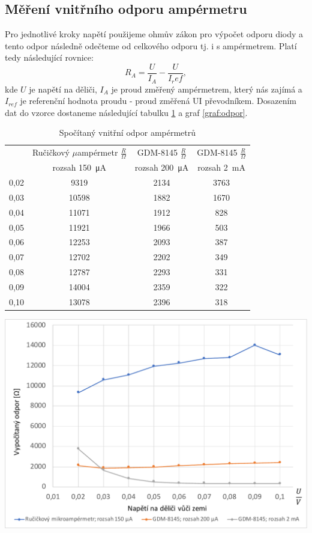 \documentclass[a4paper,12pt]{article}   %
\newcommand{\tmu}{$\mu$}
\begin{document}
\subsection{Měření vnitřního odporu ampérmetru}
Pro jednotlivé kroky napětí použijeme ohmův zákon pro výpočet odporu diody a tento odpor následně odečteme od celkového odporu tj. i s ampérmetrem. Platí tedy následující rovnice:
\begin{equation}
    R_A=\frac{U}{I_A} - \frac{U}{I_ref},
\end{equation}
kde $U$ je napětí na děliči, $I_A$ je proud změřený ampérmetrem, který nás zajímá a $I_{ref}$ je referenční hodnota proudu - proud změřená UI převodníkem. Dosazením dat do vzorce dostaneme následující tabulku \ref{tab:odpor} a graf \ref{graf:odpor}.
\begin{table}[h!]
    \centering
    \begin{tabular}{|c|c|c|c|}
        \hline
        \rule{0pt}{2.5ex}
        \multirow{2}{*}{Napětí na děliči} &Ručičkový \tmu ampérmetr	$\frac{R}{\Omega}$ &GDM-8145 $\frac{R}{\Omega}$	&GDM-8145 $\frac{R}{\Omega}$\\[.7ex]
        & rozsah  150~μA & rozsah 200~μA & rozsah  2~mA \\\hline\hline
        0,02&9319&2134&3763\\\hline
        0,03&10598&1882&1670\\\hline
        0,04&11071&1912&828\\\hline
        0,05&11921&1966&503\\\hline
        0,06&12253&2093&387\\\hline
        0,07&12702&2202&349\\\hline
        0,08&12787&2293&331\\\hline
        0,09&14004&2359&322\\\hline
        0,10&13078&2396&318\\\hline
    \end{tabular}
    \caption{Spočítaný vnitřní odpor ampérmetrů}
    \label{tab:odpor}
\end{table}

\begin{graf}[h!]
    \centering
    \includegraphics[width=.8\textwidth]{graf_odpor.pdf}
    \caption{Závislost naměřeného odporu na vstupním napětí}
    \label{graf:odpor}
\end{graf}
\end{document}
